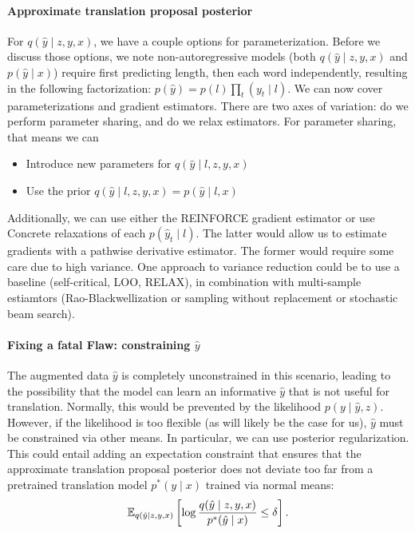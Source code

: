 \documentclass[11pt]{article}
\begin{document}
\paragraph{Approximate translation proposal posterior}
For $q(\hat{y} \mid z, y, x)$, we have a couple options for parameterization.
Before we discuss those options, we note non-autoregressive models (both $q(\hat{y}\mid z,y,x)$
and $p(\hat{y} \mid x)$) require first predicting length, then each word independently,
resulting in the following factorization: $p(\hat{y}) = p(l)\prod_t(y_t \mid l)$.
We can now cover parameterizations and gradient estimators.
There are two axes of variation: do we perform parameter sharing,
and do we relax estimators.
For parameter sharing, that means we can
\begin{itemize}
\item Introduce new parameters for $q(\hat{y} \mid l, z, y, x)$
\item Use the prior $q(\hat{y} \mid l, z, y, x) = p(\hat{y} \mid l, x)$
\end{itemize}
Additionally, we can use either the REINFORCE gradient estimator or
use Concrete relaxations of each $p(\hat{y}_t \mid l)$.
The latter would allow us to estimate gradients with a pathwise derivative estimator.
The former would require some care due to high variance.
One approach to variance reduction could be to use a baseline (self-critical, LOO, RELAX),
in combination with multi-sample estiamtors
(Rao-Blackwellization or sampling without replacement or stochastic beam search).

\paragraph{Fixing a fatal Flaw: constraining $\hat{y}$}
The augmented data $\hat{y}$ is completely unconstrained in this scenario,
leading to the possibility that the model can learn an informative $\hat{y}$
that is not useful for translation.
Normally, this would be prevented by the likelihood $p(y \mid \hat{y},z)$.
However, if the likelihood is too flexible (as will likely be the case for us),
$\hat{y}$ must be constrained via other means.
In particular, we can use posterior regularization.
This could entail adding an expectation constraint that ensures that the
approximate translation proposal posterior does not deviate too far from a pretrained
translation model $p^*(y \mid x)$ trained via normal means:
$$\mathbb{E}_{q(\hat{y} \mid z, y, x)}\left[ \log \frac{q(\hat{y} \mid z, y, x)}{p^*(\hat{y} \mid x)} \le \delta\right].$$
\end{document}

